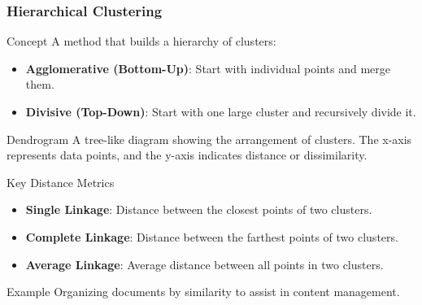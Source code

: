 \documentclass[aspectratio=169]{beamer}
\begin{document}
\begin{frame}[fragile]
    \frametitle{Hierarchical Clustering}
    \begin{block}{Concept}
        A method that builds a hierarchy of clusters:
        \begin{itemize}
            \item \textbf{Agglomerative (Bottom-Up)}: Start with individual points and merge them.
            \item \textbf{Divisive (Top-Down)}: Start with one large cluster and recursively divide it.
        \end{itemize}
    \end{block}
    \begin{block}{Dendrogram}
        A tree-like diagram showing the arrangement of clusters. The x-axis represents data points, and the y-axis indicates distance or dissimilarity.
    \end{block}
    \begin{block}{Key Distance Metrics}
        \begin{itemize}
            \item \textbf{Single Linkage}: Distance between the closest points of two clusters.
            \item \textbf{Complete Linkage}: Distance between the farthest points of two clusters.
            \item \textbf{Average Linkage}: Average distance between all points in two clusters.
        \end{itemize}
    \end{block}
    \begin{block}{Example}
        Organizing documents by similarity to assist in content management.
    \end{block}
\end{frame}
\end{document}
